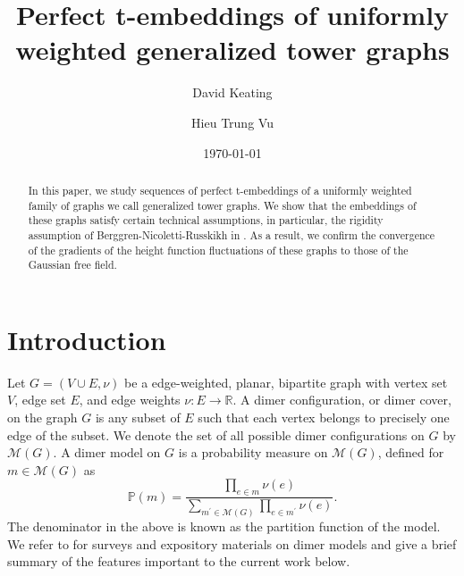 \documentclass[12pt]{amsart}
\newcommand{\R}{{\mathbb R}}
\numberwithin{equation}{section}
\theoremstyle{definition}
\begin{document}
\title{Perfect t-embeddings of uniformly weighted generalized tower graphs}
\author{David Keating} 
\address{Department of Mathematics, University of Illinois, Urbana, IL 61821, U.S.A. 
\break  e-mail: dkeating@illinois.edu
}
\author{Hieu Trung Vu}
\address{Department of Mathematics, University of Illinois, Urbana, IL 61821, U.S.A. 
\break  e-mail: hvu@illinois.edu}
\begin{abstract}
In this paper, we study sequences of perfect t-embeddings of a uniformly weighted family of graphs we call generalized tower graphs. We show that the embeddings of these graphs satisfy certain technical assumptions, in particular, the rigidity assumption of Berggren-Nicoletti-Russkikh in \cite{tower_AD_perfect}.  As a result, we confirm the convergence of the gradients of the height function fluctuations of these graphs to those of the Gaussian free field. 
\end{abstract}


\maketitle
\date{\today}
\tableofcontents

\section{Introduction}

Let $G=(V \cup E,\nu)$ be a edge-weighted, planar, bipartite graph with vertex set $V$, edge set $E$, and edge weights  $\nu: E \to \R$. A dimer configuration, or dimer cover, on the graph $G$ is any subset of $E$ such that each vertex belongs to precisely one edge of the subset. We denote the set of all possible dimer configurations on $G$ by $\mathcal M(G)$. A dimer model on $G$ is a probability measure on $\mathcal M(G)$, defined for $m \in \mathcal M(G)$ as 
$$
\mathbb{P}(m)=\frac{\prod_{e \in m} \nu(e)}{\sum_{m^{\prime}\in \mathcal{M}(G)} \prod_{e \in m^{\prime}} \nu(e)}.
$$
The denominator in the above is known as the partition function of the model. We refer to \cite{MR2523460,MR2198850,MR4299268,MR3444135} for surveys and expository materials on dimer models and give a brief summary of the features important to the current work below.
\end{document}
